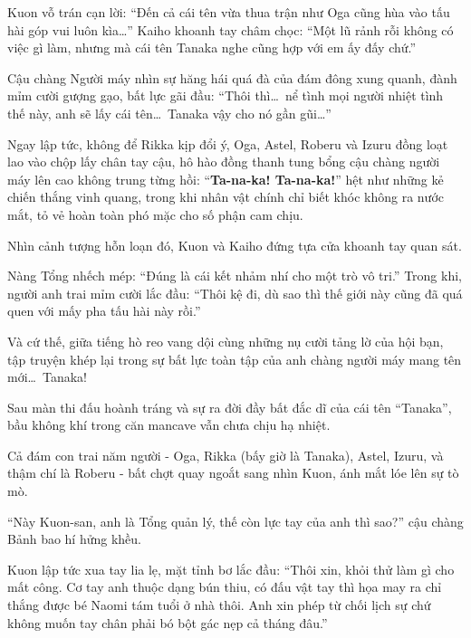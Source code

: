 \documentclass[../main.tex]{subfiles}
\begin{document}

Kuon vỗ trán cạn lời: ``Đến cả cái tên vừa thua trận như Oga cũng hùa vào tấu hài góp vui luôn kìa\dots'' Kaiho khoanh tay châm chọc: ``Một lũ rảnh rỗi không có việc gì làm, nhưng mà cái tên Tanaka nghe cũng hợp với em ấy đấy chứ.''

Cậu chàng Người máy nhìn sự hăng hái quá đà của đám đông xung quanh, đành mỉm cười gượng gạo, bất lực gãi đầu: ``Thôi thì\dots\ nể tình mọi người nhiệt tình thế này, anh sẽ lấy cái tên\dots\ Tanaka vậy cho nó gần gũi\dots''

Ngay lập tức, không để Rikka kịp đổi ý, Oga, Astel, Roberu và Izuru đồng loạt lao vào chộp lấy chân tay cậu, hô hào đồng thanh tung bổng cậu chàng người máy lên cao không trung từng hồi: ``\textbf{Ta-na-ka! Ta-na-ka!}'' hệt như những kẻ chiến thắng vinh quang, trong khi nhân vật chính chỉ biết khóc không ra nước mắt, tỏ vẻ hoàn toàn phó mặc cho số phận cam chịu.


Nhìn cảnh tượng hỗn loạn đó, Kuon và Kaiho đứng tựa cửa khoanh tay quan sát.

Nàng Tổng nhếch mép: ``Đúng là cái kết nhảm nhí cho một trò vô tri.'' Trong khi, người anh trai mỉm cười lắc đầu: ``Thôi kệ đi, dù sao thì thế giới này cũng đã quá quen với mấy pha tấu hài này rồi.''

Và cứ thế, giữa tiếng hò reo vang dội cùng những nụ cười tảng lờ của hội bạn, tập truyện khép lại trong sự bất lực toàn tập của anh chàng người máy mang tên mới\dots\ Tanaka!

\omk

Sau màn thi đấu hoành tráng và sự ra đời đầy bất đắc dĩ của cái tên ``Tanaka'', bầu không khí trong căn mancave vẫn chưa chịu hạ nhiệt.

Cả đám con trai năm người - Oga, Rikka (bấy giờ là Tanaka), Astel, Izuru, và thậm chí là Roberu - bất chợt quay ngoắt sang nhìn Kuon, ánh mắt lóe lên sự tò mò.

``Này Kuon-san, anh là Tổng quản lý, thế còn lực tay của anh thì sao?'' cậu chàng Bảnh bao hí hửng khều.

Kuon lập tức xua tay lia lẹ, mặt tỉnh bơ lắc đầu: ``Thôi xin, khỏi thử làm gì cho mất công. Cơ tay anh thuộc dạng bún thiu, có đấu vật tay thì họa may ra chỉ thắng được bé Naomi tám tuổi ở nhà thôi. Anh xin phép từ chối lịch sự chứ không muốn tay chân phải bó bột gác nẹp cả tháng đâu.''
\end{document}

